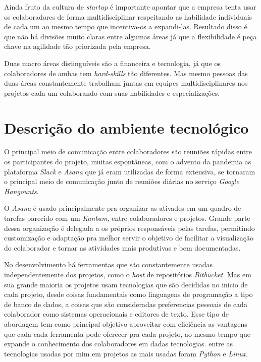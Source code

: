 \documentclass{ufscar}
\begin{document}
Ainda fruto da cultura de \textit{startup} é importante apontar que a empresa tenta usar os colaboradores de forma multidisciplinar respeitando as habilidade individuais de cada um ao mesmo tempo que incentiva-os a expandi-las. Resultado disso é que não há divisões muito claras entre algumas áreas já que a flexibilidade é peça chave na agilidade tão priorizada pela empresa.

Duas macro áreas distinguíveis são a financeira e tecnologia, já que os colaboradores de ambas tem \textit{hard-skills} tão diferentes. Mas mesmo pessoas das duas áreas constantemente trabalham juntas em equipes multidisciplinares nos projetos cada um colaborando com suas habilidades e especializações.

\section{Descrição do ambiente tecnológico}
O principal meio de comunicação entre colaboradores são reuniões rápidas entre os participantes do projeto, muitas espontâneas, com o advento da pandemia as plataforma \textit{Slack} e \textit{Asana} que já eram utilizadas de forma extensiva, se tornaram o principal meio de comunicação junto de reuniões diárias no serviço \textit{Google Hangounts}.

O \textit{Asana} é usado principalmente pra organizar as ativades em um quadro de tarefas parecido com um \textit{Kanbam}, entre colaboradores e projetos. Grande parte dessa organização é delegada a os próprios responsáveis pelas tarefas, permitindo customização e adaptação pra melhor servir o objetivo de facilitar a visualização do colaborador e tornar as atividades mais produtivas e bem documentadas. 

No desenvolvimento há ferramentas que são constantemente usadas independentemente dos projetos, como o \textit{host} de repositórios \textit{Bitbucket}. Mas em sua grande maioria os projetos usam tecnologias que são decididas no inicio de cada projeto, desde coisas fundamentais como linguagens de programação a tipo de banco de dados, a coisas que são consideradas preferencias pessoais de cada colaborador como sistemas operacionais e editores de texto. Esse tipo de abordagem tem como principal objetivo aproveitar com eficiência as vantagens que cada cada ferramenta pode oferecer pra cada projeto, ao mesmo tempo que expande o conhecimento dos colaboradores em dadas tecnologias. entre as tecnologias usadas por mim em projetos as mais usadas foram \textit{Python} e \textit{Linux}.
\end{document}
